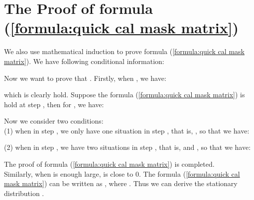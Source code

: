 \documentclass[lettersize,journal]{IEEEtran}
\begin{document}
\section{The Proof of formula (\ref{formula:quick cal mask matrix})} \label{appendix2}
We also use mathematical induction to prove formula (\ref{formula:quick cal mask matrix}). We have following conditional information:

Now we want to prove that .
Firstly, when , we have:

which is clearly hold. Suppose the formula (\ref{formula:quick cal mask matrix}) is hold at step , then for , we have:

Now we consider two conditions: \\
(1) when  in step , we only have one situation in step , that is, , so that we have:

(2) when  in step , we have two situations in step , that is,  and , so that we have:

The proof of formula (\ref{formula:quick cal mask matrix}) is completed.\\
Similarly, when  is enough large,  is close to 0. The formula (\ref{formula:quick cal mask matrix}) can be written as , where . Thus we can derive the stationary distribution . 


 

\normalem
\balance

\end{document}
